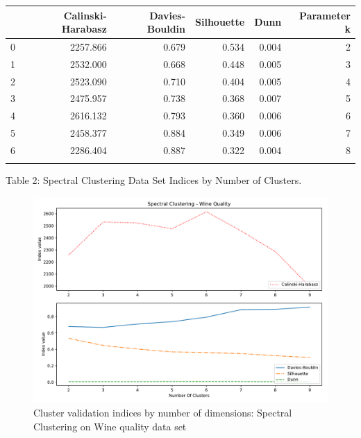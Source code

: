\begin{tabular}{lrrrrr}



{} &  Calinski-Harabasz &  Davies-Bouldin &  Silhouette &   Dunn &  Parameter k \\ \hline
0 &           2257.866 &           0.679 &       0.534 &  0.004 &          2 \\
1 &           2532.000 &           0.668 &       0.448 &  0.005 &          3 \\
2 &           2523.090 &           0.710 &       0.404 &  0.005 &          4 \\
3 &           2475.957 &           0.738 &       0.368 &  0.007 &          5 \\
4 &           2616.132 &           0.793 &       0.360 &  0.006 &          6 \\
5 &           2458.377 &           0.884 &       0.349 &  0.006 &          7 \\
6 &           2286.404 &           0.887 &       0.322 &  0.004 &          8 \\ \newline


\end{tabular}

Table 2: Spectral Clustering Data Set Indices by Number of Clusters.  \newline

\begin{figure}[H]
    \centering
    \includegraphics[width=1\textwidth]{images/Spectral_Clustering_-_Wine_Quality.pdf}
    \caption{Cluster validation indices by number of dimensions: Spectral Clustering on Wine quality data set}
    \label{fig:my_label323}
\end{figure}

